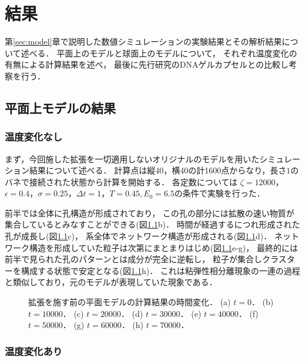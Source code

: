\chapter{結果}
\label{sec:result}

第\ref{sec:model}章で説明した数値シミュレーションの実験結果とその解析結果について述べる．
平面上のモデルと球面上のモデルについて，
それぞれ温度変化の有無による計算結果を述べ，
最後に先行研究のDNAゲルカプセルとの比較し考察を行う．

\section{平面上モデルの結果}

\subsection{温度変化なし}

まず，今回施した拡張を一切適用しないオリジナルのモデルを用いたシミュレーション結果について述べる．
計算点は縦40，横40の計1600点からなり，長さ$1$のバネで接続された状態から計算を開始する．
各定数については
$\zeta=12000$，$\epsilon=0.4$，$\sigma=0.25$，$\Delta t=1$，$T=0.45, E_0=6.5$の条件で実験を行った．

前半では全体に孔構造が形成されており，
この孔の部分には拡散の速い物質が集合しているとみなすことができる(図\ref{fig:result_2d_without_anearing}b)．
時間が経過するにつれ形成された孔が成長し(図\ref{fig:result_2d_without_anearing}c)，
系全体でネットワーク構造が形成される(図\ref{fig:result_2d_without_anearing}d)．
ネットワーク構造を形成していた粒子は次第にまとまりはじめ(図\ref{fig:result_2d_without_anearing}e-g)，
最終的には前半で見られた孔のパターンとは成分が完全に逆転し，
粒子が集合しクラスターを構成する状態で安定となる(図\ref{fig:result_2d_without_anearing}h)．
これは粘弾性相分離現象の一連の過程と類似しており，元のモデルが表現していた現象である．

\begin{figure}
\centering

\caption{
    拡張を施す前の平面モデルの計算結果の時間変化．
    (a) $t=0$．
    (b) $t=10000$．
    (c) $t=20000$．
    (d) $t=30000$．
    (e) $t=40000$．
    (f) $t=50000$．
    (g) $t=60000$．
    (h) $t=70000$．
}
\label{fig:result_2d_without_anearing}
\end{figure}

\subsection{温度変化あり}

